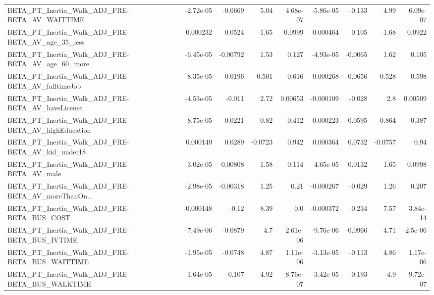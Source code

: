 \begin{tabular}{lrrrrrrrr}
BETA\_PT\_Inertia\_Walk\_ADJ\_FRE-BETA\_AV\_WAITTIME      &   -2.72e-05 &      -0.0669 &     5.04 & 4.68e-07 &  -5.86e-05 &      -0.133 &         4.99 &      6.09e-07 \\
BETA\_PT\_Inertia\_Walk\_ADJ\_FRE-BETA\_AV\_age\_35\_less   &    0.000232 &       0.0524 &    -1.65 &   0.0999 &   0.000464 &       0.105 &        -1.68 &        0.0922 \\
BETA\_PT\_Inertia\_Walk\_ADJ\_FRE-BETA\_AV\_age\_60\_more   &   -6.45e-05 &     -0.00792 &     1.53 &    0.127 &  -4.93e-05 &     -0.0065 &         1.62 &         0.105 \\
BETA\_PT\_Inertia\_Walk\_ADJ\_FRE-BETA\_AV\_fulltimeJob   &    8.35e-05 &       0.0196 &    0.501 &    0.616 &   0.000268 &      0.0656 &        0.528 &         0.598 \\
BETA\_PT\_Inertia\_Walk\_ADJ\_FRE-BETA\_AV\_haveLicense   &   -4.53e-05 &       -0.011 &     2.72 &  0.00653 &  -0.000109 &      -0.028 &          2.8 &       0.00509 \\
BETA\_PT\_Inertia\_Walk\_ADJ\_FRE-BETA\_AV\_highEducation &    8.75e-05 &       0.0221 &     0.82 &    0.412 &   0.000223 &      0.0595 &        0.864 &         0.387 \\
BETA\_PT\_Inertia\_Walk\_ADJ\_FRE-BETA\_AV\_kid\_under18   &    0.000149 &       0.0289 &  -0.0723 &    0.942 &   0.000364 &      0.0732 &      -0.0757 &          0.94 \\
BETA\_PT\_Inertia\_Walk\_ADJ\_FRE-BETA\_AV\_male          &    3.02e-05 &      0.00808 &     1.58 &    0.114 &   4.65e-05 &      0.0132 &         1.65 &        0.0998 \\
BETA\_PT\_Inertia\_Walk\_ADJ\_FRE-BETA\_AV\_moreThanOn... &   -2.98e-05 &     -0.00318 &     1.25 &     0.21 &  -0.000267 &      -0.029 &         1.26 &         0.207 \\
BETA\_PT\_Inertia\_Walk\_ADJ\_FRE-BETA\_BUS\_COST         &   -0.000148 &        -0.12 &     8.39 &      0.0 &  -0.000372 &      -0.234 &         7.57 &      3.84e-14 \\
BETA\_PT\_Inertia\_Walk\_ADJ\_FRE-BETA\_BUS\_IVTIME       &   -7.49e-06 &      -0.0879 &      4.7 & 2.61e-06 &  -9.76e-06 &     -0.0966 &         4.71 &       2.5e-06 \\
BETA\_PT\_Inertia\_Walk\_ADJ\_FRE-BETA\_BUS\_WAITTIME     &   -1.95e-05 &      -0.0748 &     4.87 & 1.11e-06 &  -3.13e-05 &      -0.113 &         4.86 &      1.17e-06 \\
BETA\_PT\_Inertia\_Walk\_ADJ\_FRE-BETA\_BUS\_WALKTIME     &   -1.64e-05 &       -0.107 &     4.92 & 8.76e-07 &  -3.42e-05 &      -0.193 &          4.9 &      9.72e-07 \\

\end{tabular}
